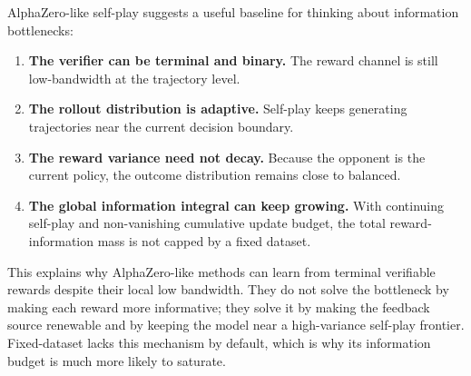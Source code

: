 AlphaZero-like self-play suggests a useful baseline for thinking about information bottlenecks:
\begin{enumerate}
  \item \textbf{The verifier can be terminal and binary.} The reward channel is still low-bandwidth at the trajectory level.
  \item \textbf{The rollout distribution is adaptive.} Self-play keeps generating trajectories near the current decision boundary.
  \item \textbf{The reward variance need not decay.} Because the opponent is the current policy, the outcome distribution remains close to balanced.
  \item \textbf{The global information integral can keep growing.} With continuing self-play and non-vanishing cumulative update budget, the total reward-information mass is not capped by a fixed dataset.
\end{enumerate}

This explains why AlphaZero-like methods can learn from terminal verifiable rewards despite their local low bandwidth. They do not solve the bottleneck by making each reward more informative; they solve it by making the feedback source renewable and by keeping the model near a high-variance self-play frontier. Fixed-dataset \llm{} \rlvr{} lacks this mechanism by default, which is why its information budget is much more likely to saturate.
